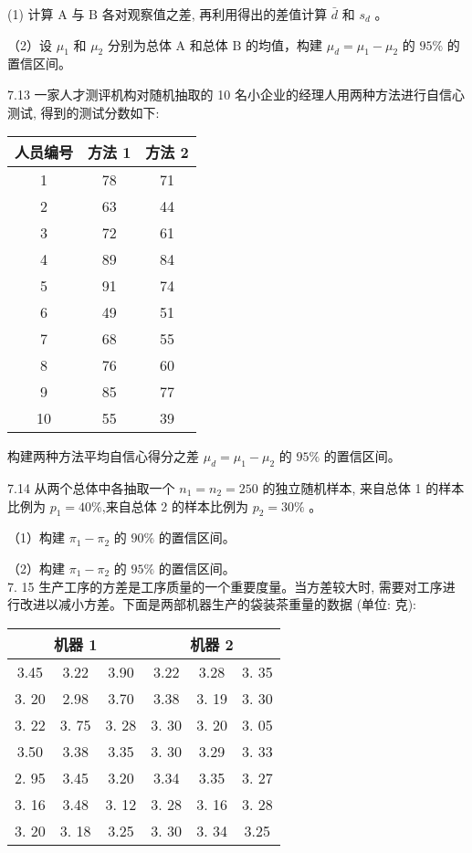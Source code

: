 \documentclass[10pt]{article}
\begin{document}
\begin{CJK*}{UTF8}{bsmi}
(1) 计算 $\mathrm{A}$ 与 $\mathrm{B}$ 各对观察值之差, 再利用得出的差值计算 $\bar{d}$ 和 $s_{d}$ 。

（2）设 $\mu_{1}$ 和 $\mu_{2}$ 分别为总体 $\mathrm{A}$ 和总体 $\mathrm{B}$ 的均值，构建 $\mu_{d}=\mu_{1}-\mu_{2}$ 的 $95 \%$ 的置信区间。

7.13 一家人才测评机构对随机抽取的 10 名小企业的经理人用两种方法进行自信心测试, 得到的测试分数如下:

\begin{center}
\begin{tabular}{ccc}
\hline
人员编号 & 方法 1 & 方法 2 \\
\hline
1 & 78 & 71 \\
2 & 63 & 44 \\
3 & 72 & 61 \\
4 & 89 & 84 \\
5 & 91 & 74 \\
6 & 49 & 51 \\
7 & 68 & 55 \\
8 & 76 & 60 \\
9 & 85 & 77 \\
10 & 55 & 39 \\
\hline
\end{tabular}
\end{center}

构建两种方法平均自信心得分之差 $\mu_{d}=\mu_{1}-\mu_{2}$ 的 $95 \%$ 的置信区间。

7.14 从两个总体中各抽取一个 $n_{1}=n_{2}=250$ 的独立随机样本, 来自总体 1 的样本比例为 $p_{1}=40 \%$,来自总体 2 的样本比例为 $p_{2}=30 \%$ 。

（1）构建 $\pi_{1}-\pi_{2}$ 的 $90 \%$ 的置信区间。

（2）构建 $\pi_{1}-\pi_{2}$ 的 $95 \%$ 的置信区间。\\
7. 15 生产工序的方差是工序质量的一个重要度量。当方差较大时, 需要对工序进行改进以减小方差。下面是两部机器生产的袋装茶重量的数据 (单位: 克):

\begin{center}
\begin{tabular}{|c|c|c|c|c|c|}
\hline
\multicolumn{3}{|c|}{机器 1} & \multicolumn{3}{|c|}{机器 2} \\
\hline
3.45 & 3.22 & 3.90 & 3.22 & 3.28 & 3. 35 \\
\hline
3. 20 & 2.98 & 3.70 & 3.38 & 3. 19 & 3. 30 \\
\hline
3. 22 & 3. 75 & 3. 28 & 3. 30 & 3. 20 & 3. 05 \\
\hline
3.50 & 3.38 & 3.35 & 3. 30 & 3.29 & 3. 33 \\
\hline
2. 95 & 3.45 & 3.20 & 3.34 & 3.35 & 3. 27 \\
\hline
3. 16 & 3.48 & 3. 12 & 3. 28 & 3. 16 & 3. 28 \\
\hline
3. 20 & 3. 18 & 3.25 & 3. 30 & 3. 34 & 3.25 \\
\hline
\end{tabular}
\end{center}


\end{CJK*}
\end{document}

